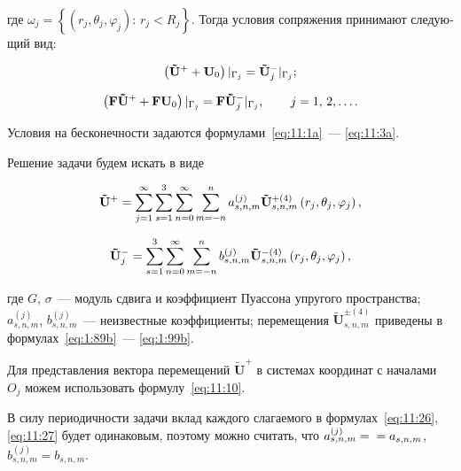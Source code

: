 \begin{russian}
\noindent где $\omega_j = \left\{ {\left( {{r_j},{\theta _j},{\varphi _j}} \right):\, {r_j} < {R_j}} \right\}$. Тогда условия сопряжения принимают следующий вид:

\begin{equation}
\left( {{{{\bf{\tilde U}}}^ + } + {{\bf{U}}_0}} \right){|_{{\Gamma _j}}} = {\bf{\tilde U}}_j^ - {|_{{\Gamma _j}}};
\label{eq:11:24}
\end{equation}

\begin{equation}
\left( {{\bf{F\tilde U^+}} + {\bf{F}}{{\bf{U}}_0}} \right){|_{{\Gamma _j}}} = {\bf{F}}{{\bf{\tilde U^-}}_j}{|_{{\Gamma _j}}},\qquad {\kern 1pt} j = 1,{\mkern 1mu} {\kern 1pt} 2,\dots.
\label{eq:11:25}
\end{equation}

\noindent Условия на бесконечности задаются формулами~\eqref{eq:11:1a}~--- \eqref{eq:11:3a}.

Решение задачи будем искать в виде

\begin{equation}
{\bf{\tilde U^+}} = \sum\limits_{j = 1}^\infty {\sum\limits_{s = 1}^3 {\sum\limits_{n = 0}^\infty  {\sum\limits_{m=-n}^{n} {a_{s,n,m}^{(j)}} } } } {\bf{\tilde U}}_{s,n,m}^{ + (4)}\left( {{r_j},{\theta _j},{\varphi _j}} \right),
\label{eq:11:26}
\end{equation}

\begin{equation}
\mathbf{\tilde U}_j^- = {\sum\limits_{s = 1}^3 {\sum\limits_{n = 0}^\infty  {\sum\limits_{m=-n}^{n} {b_{s,n,m}^{(j)}} } } } {\bf{\tilde U}}_{s,n,m}^{ - (4)}\left( {{r_j},{\theta _j},{\varphi _j}} \right),
\label{eq:11:27}
\end{equation}

\noindent где $G$, $\sigma$~--- модуль сдвига и коэффициент Пуассона упругого пространства; $a_{s,n,m}^{(j)}$, $b_{s,n,m}^{(j)}$~--- неизвестные коэффициенты; перемещения $\mathbf{\tilde U}_{s,n,m}^{\pm(4)}$ приведены в формулах~\eqref{eq:1:89b}~--- \eqref{eq:1:99b}.

Для представления вектора перемещений $\mathbf{\tilde U}^+$ в системах координат с началами $O_j$ можем использовать формулу~\eqref{eq:11:10}.

В силу периодичности задачи вклад каждого слагаемого в формулах~\eqref{eq:11:26}, \eqref{eq:11:27} будет одинаковым, поэтому можно считать, что $a_{s,n,m}^{(j)}=\\=a_{s,n,m}$, $b_{s,n,m}^{(j)}=b_{s,n,m}$.


\end{russian}
